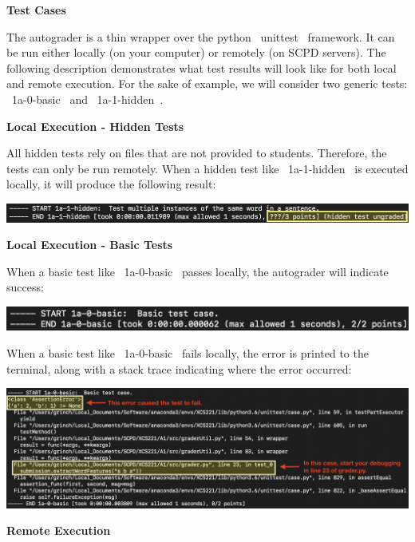 {\bf Test Cases}

The autograder is a thin wrapper over the python ~unittest~ framework.  It can
be run either locally (on your computer) or remotely (on SCPD servers).  The
following description demonstrates what test results will look like for both
local and remote execution.  For the sake of example, we will consider two
generic tests: ~1a-0-basic~ and ~1a-1-hidden~.

{\bf Local Execution - Hidden Tests}

All hidden tests rely on files that are not provided to students.  Therefore,
the tests can only be run remotely.  When a hidden test like ~1a-1-hidden~ is
executed locally, it will produce the following result:

\begin{center}
\includegraphics[width=1\textwidth]{00-instructions/local-hidden.png}
\end{center}

{\bf Local Execution - Basic Tests}

When a basic test like ~1a-0-basic~ passes locally, the autograder will indicate
success:

\begin{center}
\includegraphics[width=1\textwidth]{00-instructions/local-basic-passed.png}
\end{center}

When a basic test like ~1a-0-basic~ fails locally, the error is printed to the
terminal, along with a stack trace indicating where the error occurred:

\begin{center}
\includegraphics[width=1\textwidth]{00-instructions/local-basic-failed.png}
\end{center}

{\bf Remote Execution}

